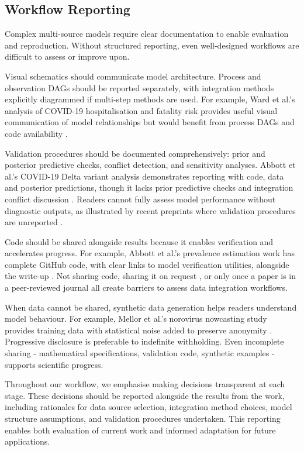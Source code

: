 \documentclass{article}
\begin{document}
\subsection{Workflow Reporting}
Complex multi-source models require clear documentation to enable evaluation and reproduction.
Without structured reporting, even well-designed workflows are difficult to assess or improve upon.

Visual schematics should communicate model architecture.
Process and observation DAGs should be reported separately, with integration methods explicitly diagrammed if multi-step methods are used.
For example, Ward et al.'s analysis of COVID-19 hospitalisation and fatality risk provides useful visual communication of model relationships but would benefit from process DAGs and code availability \citep{Ward2024-sp}.

Validation procedures should be documented comprehensively: prior and posterior predictive checks, conflict detection, and sensitivity analyses.
Abbott et al.'s COVID-19 Delta variant analysis demonstrates reporting with code, data and posterior predictions, though it lacks prior predictive checks and integration conflict discussion \citep{Abbott2021-delta}.
Readers cannot fully assess model performance without diagnostic outputs, as illustrated by recent preprints where validation procedures are unreported \citep{Fyles2024-qz}.

Code should be shared alongside results because it enables verification and accelerates progress.
For example, Abbott et al.'s prevalence estimation work has complete GitHub code, with clear links to model verification utilities, alongside the write-up \citep{Abbott2022-prevalence}.
Not sharing code, sharing it on request \citep{Ward2024-sp}, or only once a paper is in a peer-reviewed journal \citep{Fyles2024-qz} all create barriers to assess data integration workflows.

When data cannot be shared, synthetic data generation helps readers understand model behaviour.
For example, Mellor et al.'s norovirus nowcasting study provides training data with statistical noise added to preserve anonymity \citep{Mellor2025-noroviru}.
Progressive disclosure is preferable to indefinite withholding.
Even incomplete sharing - mathematical specifications, validation code, synthetic examples - supports scientific progress.

Throughout our workflow, we emphasise making decisions transparent at each stage.
These decisions should be reported alongside the results from the work, including rationales for data source selection, integration method choices, model structure assumptions, and validation procedures undertaken.
This reporting enables both evaluation of current work and informed adaptation for future applications.
\end{document}
